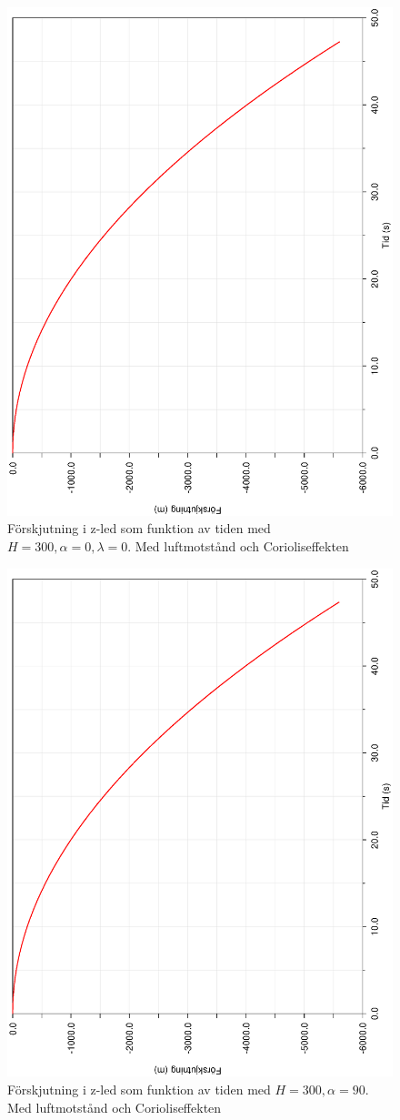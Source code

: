 \documentclass[a4paper]{article}
\begin{document}
\begin{figure}[h!]
	\centering
	\includegraphics[width=0.5\linewidth, angle=-90]{Data/ZdisplacementAlpha0Lambda0.eps}
	\caption{Förskjutning i z-led som funktion av tiden med $H = 300, \alpha = 0, \lambda = 0$. Med luftmotstånd och Corioliseffekten}
	\label{fig:ZAlpha0Lambda0}
\end{figure}

\begin{figure}[h!]
	\centering
	\includegraphics[width=0.5\linewidth, angle=-90]{Data/ZdisplacementAlpha90.eps}
	\caption{Förskjutning i z-led som funktion av tiden med $H = 300, \alpha = 90$. Med luftmotstånd och Corioliseffekten}
	\label{fig:ZAlpha90}
\end{figure}
\end{document}

